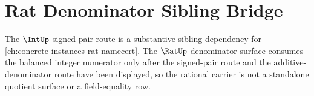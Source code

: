 \section{Rat Denominator Sibling Bridge}
\label{sec:int-rat-denominator-sibling-bridge}

The $\IntUp$ signed-pair route is a substantive sibling dependency for \autoref{ch:concrete-instances-rat-namecert}. The $\RatUp$ denominator surface consumes the balanced integer numerator only after the signed-pair route and the additive-denominator route have been displayed, so the rational carrier is not a standalone quotient surface or a field-equality row.
